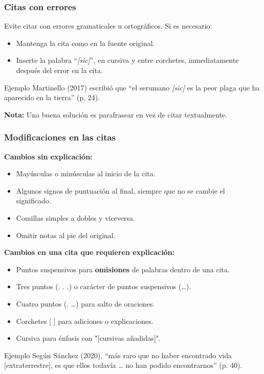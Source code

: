 \documentclass[
11pt, %
]{beamer}
\begin{document}
\begin{frame}
	\frametitle{Citas con errores}

	Evite citar con errores gramaticales u ortográficos. Si es necesario:
	\begin{itemize}
		\item Mantenga la cita como en la fuente original.
		\item Inserte la palabra ``\textit{[sic]}'', en cursiva y entre corchetes, inmediatamente después del error en la cita.
	\end{itemize}

	\begin{exampleblock}{Ejemplo}
		Martinello (2017) escribió que ``el {\color{red}serumano} \textit{{\color{blue}[sic]}} es la peor plaga que ha aparecido en la tierra'' (p. 24).
	\end{exampleblock}

	\textbf{Nota:} Una buena solución es parafrasear en vez de citar textualmente.

\end{frame}

\begin{frame}
	\frametitle{Modificaciones en las citas}

	\textbf{Cambios sin explicación:}
	\begin{itemize}
		\item Mayúsculas o minúsculas al inicio de la cita.
		\item Algunos signos de puntuación al final, {\color{red}siempre que no se cambie el significado}.
		\item Comillas simples a dobles y viceversa.
		\item Omitir notas al pie del original.
	\end{itemize}

	\textbf{Cambios en una cita que requieren explicación:}
	\begin{itemize}
		\item Puntos suspensivos para \textbf{omisiones} de palabras dentro de una cita.
		\item Tres puntos (. . .) o carácter de puntos suspensivos (…).
		\item Cuatro puntos (. …) para salto de oraciones.
		\item Corchetes [ ] para adiciones o explicaciones.
		\item Cursiva para énfasis con "[cursivas añadidas]".
	\end{itemize}

	\begin{exampleblock}{Ejemplo}
		Según Sánchez (2020), ``más raro que no haber encontrado vida {\color{blue}[extraterrestre]}, es que ellos todavía {\color{blue}…} no han podido encontrarnos'' (p. 40).
	\end{exampleblock}

\end{frame}
\end{document}
